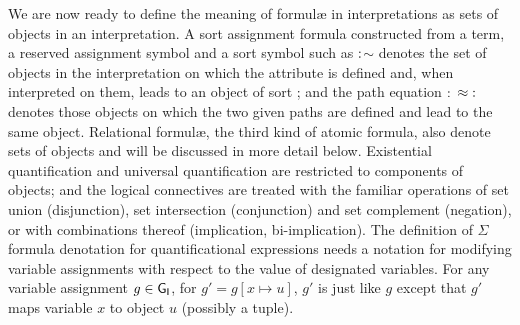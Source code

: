 \documentclass[output=paper
 	        ,biblatex
                ,babelshorthands
                ,newtxmath
                ,draftmode
                ,colorlinks, citecolor=brown
]{langscibook}
\begin{document}
{We are now ready to define the meaning of formulæ in
interpretations as sets of objects in an interpretation. A
sort assignment formula constructed from a term, a reserved assignment
symbol and a sort symbol such as
$\operatorname{:}$$\sim$ denotes the set
of objects in the interpretation on which the  attribute
is defined and, when interpreted on them, leads to an object of sort
; and the path equation $\operatorname{:}$ $\approx\operatorname{:}$ denotes those objects on which the two given paths are
defined and lead to the same object. Relational formul\ae, the
third kind of atomic formula, also denote sets of objects and will
be discussed in more detail below. Existential quantification and universal
quantification are restricted to components of objects; and the logical
connectives are treated with the familiar operations of set union
(disjunction), set intersection (conjunction) and set complement (negation),
or with combinations thereof (implication, bi-implication).
The definition of $\Sigma$ formula denotation for quantificational
expressions needs a
notation for modifying variable assignments with respect to the
value of designated variables. For any variable assignment $g\in\mathsf{G}_{\mathsf{I}}$,
for $g'=g[x \mapsto u]$, $g'$ is just like $g$ except that
$g'$ maps variable $x$ to object $u$ (possibly a tuple).


}
\end{document}
